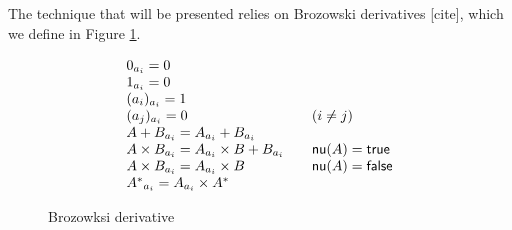 The technique that will be presented relies on  
Brozowski derivatives [cite], which we define in Figure \ref{fig:derive}.
\begin{figure}
\caption{Brozowksi derivative}
\label{fig:derive}
  \begin{displaymath}
    \begin{array}{ll}
      0_{a_{i}} = 0 & \\
      1_{a_{i}} = 0 & \\
      (a_i)_{a_{i}} = 1 & \\
      (a_j)_{a_{i}} = 0 & (i \neq j) \\
      A + B_{a_{i}} = A_{a_{i}} + B_{a_{i}} & \\ 
      A \times B_{a_{i}} = A_{a_{i}} \times B + B_{a_{i}}
      ~~~  & \mathsf{nu}(A) = \mathsf{true}\\
      A \times B_{a_{i}} = A_{a_{i}} \times B ~~~ & \mathsf{nu}(A) =
                                                            \mathsf{false}\\
      {A^*}_{a_{i}} = A_{a_{i}} \times {A^*}
    \end{array}
    \end{displaymath}
\end{figure}




